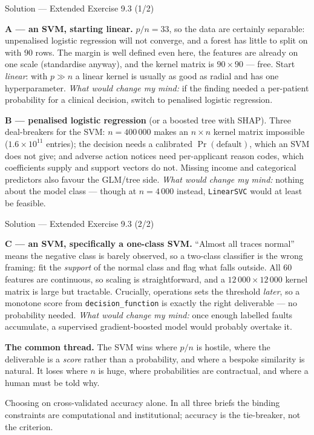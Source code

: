 \documentclass[aspectratio=169,11pt]{beamer}
\begin{document}
\begin{frame}{Solution --- Extended Exercise 9.3 (1/2)}
\begin{solutionbox}
  \scriptsize
  \textbf{A --- an SVM, starting linear.} $p/n = 33$, so the data are certainly
  separable: unpenalised logistic regression will not converge, and a forest
  has little to split on with $90$ rows. The margin is well defined even here,
  the features are already on one scale (standardise anyway), and the kernel
  matrix is $90\times90$ --- free. Start \emph{linear}: with $p\gg n$ a linear
  kernel is usually as good as radial and has one hyperparameter.
  \emph{What would change my mind:} if the finding needed a per-patient
  probability for a clinical decision, switch to penalised logistic regression.

  \textbf{B --- penalised logistic regression} (or a boosted tree with SHAP).
  Three deal-breakers for the SVM: $n=400\,000$ makes an $n\times n$ kernel
  matrix impossible ($1.6\times10^{11}$ entries); the decision needs a
  calibrated $\Pr(\text{default})$, which an SVM does not give; and adverse
  action notices need per-applicant reason codes, which coefficients supply and
  support vectors do not. Missing income and categorical predictors also favour
  the GLM/tree side. \emph{What would change my mind:} nothing about the model
  class --- though at $n=4\,000$ instead, \texttt{LinearSVC} would at least be
  feasible.
\end{solutionbox}
\end{frame}

\begin{frame}{Solution --- Extended Exercise 9.3 (2/2)}
\begin{solutionbox}
  \scriptsize
  \textbf{C --- an SVM, specifically a one-class SVM.} ``Almost all traces
  normal'' means the negative class is barely observed, so a two-class
  classifier is the wrong framing: fit the \emph{support} of the normal class
  and flag what falls outside. All $60$ features are continuous, so scaling is
  straightforward, and a $12\,000\times12\,000$ kernel matrix is large but
  tractable. Crucially, operations sets the threshold \emph{later}, so a
  monotone score from \texttt{decision\_function} is exactly the right
  deliverable --- no probability needed. \emph{What would change my mind:} once
  enough labelled faults accumulate, a supervised gradient-boosted model would
  probably overtake it.

  \textbf{The common thread.} The SVM wins where $p/n$ is hostile, where the
  deliverable is a \emph{score} rather than a probability, and where a bespoke
  similarity is natural. It loses where $n$ is huge, where probabilities are
  contractual, and where a human must be told why.
\end{solutionbox}
\begin{mistake}
  Choosing on cross-validated accuracy alone. In all three briefs the binding
  constraints are computational and institutional; accuracy is the tie-breaker,
  not the criterion.
\end{mistake}
\end{frame}
\end{document}
